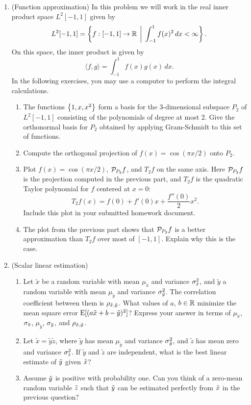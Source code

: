\documentclass[12pt,twoside]{article}
\begin{document}
\begin{enumerate}
\item (Function approximation) In this problem we will work in the real inner product space
  $L^2[-1,1]$ given by
  $$L^2[-1,1] = \left\{f:[-1,1]\to\mathbb{R}\,\biggm|\, \int_{-1}^1 f(x)^2\,dx <
  \infty\right\}.$$
  On this space, the inner product is given by
  $$\langle f,g\rangle = \int_{-1}^1 f(x)g(x)\,dx.$$
  In the following exercises, you may use a computer to perform the integral calculations.
  \begin{enumerate}
  \item The functions $\left\{ 1,x,x^2 \right\}$ form a basis for the 3-dimensional
    subspace $P_2$
    of $L^2[-1,1]$ consisting of the polynomials of degree at most $2$.
    Give the orthonormal basis for $P_2$ obtained by applying
    Gram-Schmidt to this set of functions.
  \item Compute the orthogonal projection of $f(x)=\cos(\pi x/2)$ onto $P_2$.
  \item Plot $f(x)=\cos(\pi x/2)$, $\mathcal{ P }_{P_2}f$, and $T_2f$ on the same axis.  Here
    $\mathcal{ P }_{P_2}f$ is the projection computed in the previous part, and
    $T_2f$ is the quadratic Taylor polynomial for $f$ centered at
    $x=0$:
    $$T_2f(x) = f(0) + f'(0)x + \frac{f''(0)}{2}x^2.$$ 
    Include this plot in your submitted homework document.
  \item The plot from the previous part shows that 
    $\mathcal{ P }_{P_2}f$ is a better approximation than $T_2f$
    over most of $[-1,1]$.  Explain why this is the case.
  \end{enumerate}
  
 \item (Scalar linear estimation) 
 \begin{enumerate}
 \item Let $\tilde{x}$ be a random variable with mean $\mu_{\tilde{x}}$ and variance $\sigma_{\tilde{  x }}^2$, and $\tilde{y}$ a random variable with mean $\mu_{\tilde{y}}$ and variance $\sigma_{\tilde{  y }}^2$. The correlation coefficient between them is $\rho_{\tilde{  x },\tilde{  y }}$. What values of $a$, $b \in \mathbb{R}$ minimize the mean square error $\mathrm{E}[( a \tilde{x} + b - \tilde{y} )^2]$? Express your answer in terms of $\mu_{\tilde{x}}$, $\sigma_{\tilde{  x }}$, $\mu_{\tilde{y}}$, $\sigma_{\tilde{  y }}$, and $\rho_{\tilde{  x },\tilde{  y }}$.
 \item Let $\tilde{x} = \tilde{y} \tilde{z}$, where $\tilde{y}$ has mean $\mu_{\tilde{y}}$ and variance $\sigma_{\tilde{  y }}^2$, and $\tilde{z}$ has mean zero and variance $\sigma_{\tilde{ z }}^2$. If $\tilde{y}$ and $\tilde{z}$ are independent, what is the best linear estimate of $\tilde{  y }$ given $\tilde{  x }$? 
 \item Assume $\tilde{  y }$ is positive with probability one. Can you think of a zero-mean random variable $\tilde{ z }$ such that $\tilde{  y }$ can be estimated perfectly from $ \tilde{  x }$ in the previous question? 
 \end{enumerate}
 

\end{enumerate}
\end{document}
